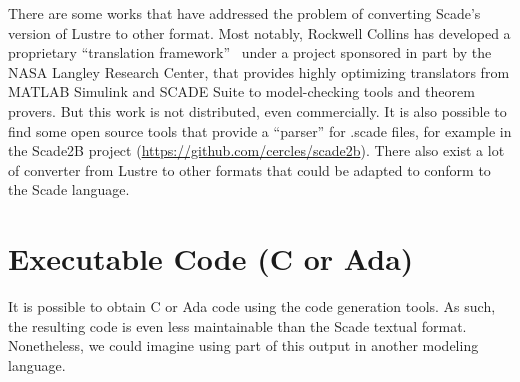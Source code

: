 \documentclass{template/openetcs_report}
\begin{document}
There are some works that have addressed the problem of converting
Scade's version of Lustre to other format. Most notably, Rockwell
Collins has developed a proprietary ``translation
framework''~\cite{whalen07} under a project sponsored in part by the
NASA Langley Research Center, that provides highly optimizing
translators from MATLAB Simulink and SCADE Suite to model-checking
tools and theorem provers. But this work is not distributed, even
commercially. It is also possible to find some open source tools that
provide a ``parser'' for .scade files, for example in the Scade2B
project (\url{https://github.com/cercles/scade2b}). There also exist a
lot of converter from Lustre to other formats that could be adapted to
conform to the Scade language.


\begin{center}
  \setlength{\fboxsep}{10pt}
\end{center}


\section{Executable Code (C or Ada)}

It is possible to obtain C or Ada code using the code generation
tools. As such, the resulting code is even less maintainable than the
Scade textual format. Nonetheless, we could imagine using part of this
output in another modeling language.

\begin{center}
  \setlength{\fboxsep}{10pt}
\end{center}
\end{document}
